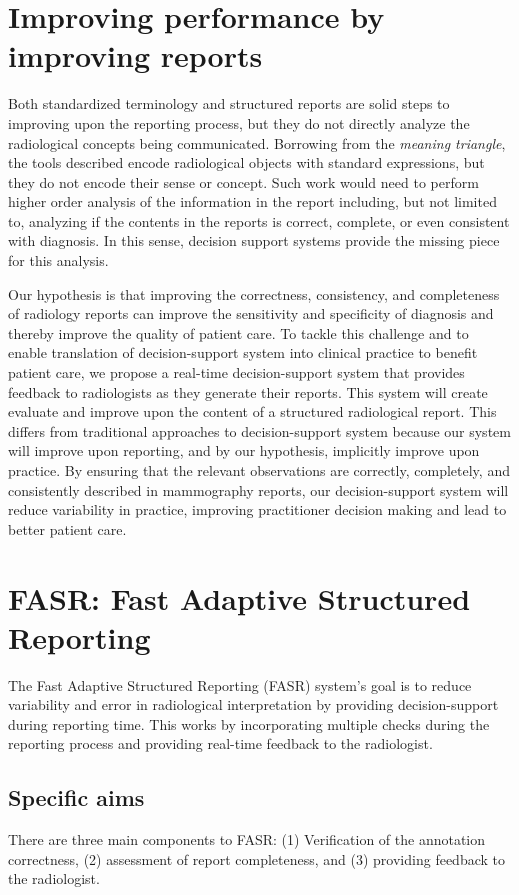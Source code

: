 \section*{Improving performance by improving reports}
Both standardized terminology and structured reports are solid steps to improving upon the reporting process, but they do not directly analyze the radiological concepts being communicated. Borrowing from the \emph{meaning triangle}, the tools described encode radiological objects with standard expressions, but they do not encode their sense or concept. Such work would need to perform higher order analysis of the information in the report including, but not limited to, analyzing if the contents in the reports is correct, complete, or even consistent with diagnosis. In this sense, decision support systems provide the missing piece for this analysis.

Our hypothesis is that improving the correctness, consistency, and completeness of radiology reports can improve the sensitivity and specificity of diagnosis and thereby improve the quality of patient care. To tackle this challenge and to enable translation of decision-support system into clinical practice to benefit patient care, we propose a real-time decision-support system that provides feedback to radiologists as they generate their reports. This system will create evaluate and improve upon the content of a structured radiological report. This differs from traditional approaches to decision-support system because our system will improve upon reporting, and by our hypothesis, implicitly improve upon practice. By ensuring that the relevant observations are correctly, completely, and consistently described in mammography reports, our decision-support system will reduce variability in practice, improving practitioner decision making and lead to better patient care.

\section*{FASR: Fast Adaptive Structured Reporting}
The Fast Adaptive Structured Reporting (FASR) system's goal is to reduce variability and error in radiological interpretation by providing decision-support during reporting time. This works by incorporating multiple checks during the reporting process and providing real-time feedback to the radiologist.

\subsection{Specific aims}
There are three main components to FASR: (1) Verification of the annotation correctness, (2) assessment of report completeness, and (3) providing feedback to the radiologist.

